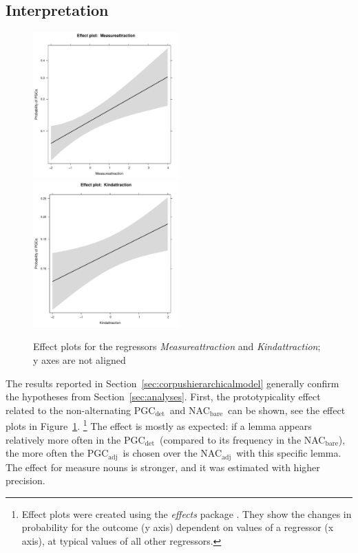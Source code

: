 \documentclass[USenglish]{article}
\newcommand{\Sub}[1]{\ensuremath{\mathrm{_{#1}}}}
\newcommand{\NACb}{NAC\Sub{bare}}
\newcommand{\NACa}{NAC\Sub{adj}}
\newcommand{\PGCd}{PGC\Sub{det}}
\newcommand{\PGCa}{PGC\Sub{adj}}
\begin{document}


\subsection{Interpretation}
\label{sec:interpretation}


\begin{figure}[h!]
  \centering
  \includegraphics[width=0.5\textwidth]{../R/output/corpus_Measureattraction}~\includegraphics[width=0.5\textwidth]{../R/output/corpus_Kindattraction}
  \caption{Effect plots for the regressors \textit{Measureattraction} and \textit{Kindattraction}; y axes are not aligned}
  \label{fig:eff:attraction}
\end{figure}

The results reported in Section~\ref{sec:corpushierarchicalmodel} generally confirm the hypotheses from Section~\ref{sec:analyses}.
First, the prototypicality effect related to the non-alternating \PGCd\ and \NACb\ can be shown, see the effect plots in Figure~\ref{fig:eff:attraction}.%
\footnote{Effect plots were created using the \textit{effects} package \citep{Fox2003}.
They show the changes in probability for the outcome (y axis) dependent on values of a regressor (x axis), at typical values of all other regressors.}
The effect is mostly as expected:
if a lemma appears relatively more often in the \PGCd\ (compared to its frequency in the \NACb), the more often the \PGCa\ is chosen over the \NACa\ with this specific lemma.
The effect for measure nouns is stronger, and it was estimated with higher precision.
\end{document}
